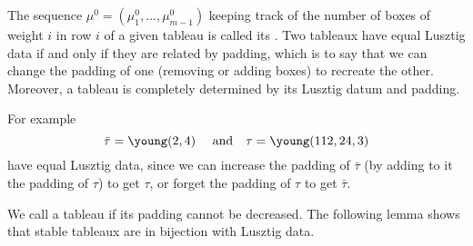 \documentclass{article}
\begin{document}
The sequence $\mu^0 = (\mu^0_1,\dots,\mu^0_{m-1})$ keeping track of the number of boxes of weight $i$ in row $i$ of a given tableau is called its . 
Two tableaux have equal Lusztig data if and only if they are related by padding, which is to say that we can change the padding of one (removing or adding boxes) to recreate the other. Moreover, a tableau is completely determined by its Lusztig datum and padding.

For example 
$$
    \bar \tau = \young(2,4) \quad \text{ and} \quad \tau = \young(112,24,3)
$$ 
have equal Lusztig data, since we can increase the padding of $\bar\tau$ (by adding to it the padding of $\tau$) to get $\tau$, or forget the padding of $\tau$ to get $\bar\tau$.

We call a tableau  if its padding cannot be decreased. The following lemma shows that stable tableaux are in bijection with Lusztig data. 
\end{document}
